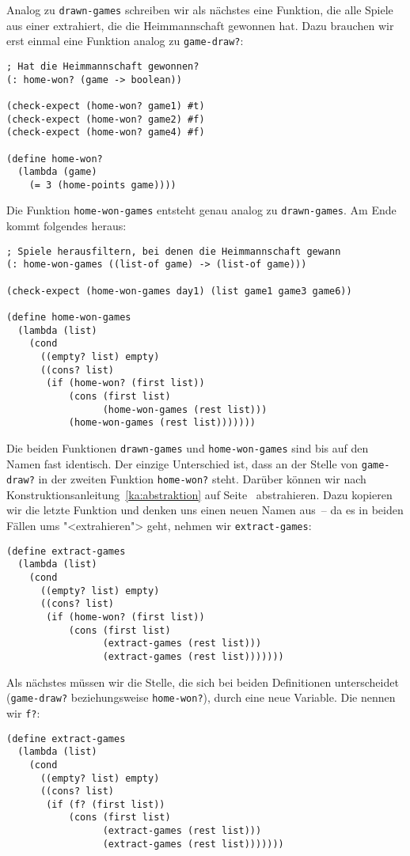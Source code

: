 Analog zu \lstinline{drawn-games} schreiben wir als nächstes eine
Funktion, die alle Spiele aus einer extrahiert, die die Heimmannschaft
gewonnen hat.  Dazu brauchen wir erst einmal eine Funktion analog zu
\lstinline{game-draw?}:
%
\begin{lstlisting}
; Hat die Heimmannschaft gewonnen?
(: home-won? (game -> boolean))

(check-expect (home-won? game1) #t)
(check-expect (home-won? game2) #f)
(check-expect (home-won? game4) #f)

(define home-won?
  (lambda (game)
    (= 3 (home-points game))))
\end{lstlisting}
%
Die Funktion \lstinline{home-won-games} entsteht genau analog zu
\lstinline{drawn-games}.  Am Ende kommt folgendes heraus:
%
\begin{lstlisting}
; Spiele herausfiltern, bei denen die Heimmannschaft gewann
(: home-won-games ((list-of game) -> (list-of game)))

(check-expect (home-won-games day1) (list game1 game3 game6))

(define home-won-games
  (lambda (list)
    (cond
      ((empty? list) empty)
      ((cons? list)
       (if (home-won? (first list))
           (cons (first list)
                 (home-won-games (rest list)))
           (home-won-games (rest list)))))))
\end{lstlisting}
%
Die beiden Funktionen \lstinline{drawn-games} und
\lstinline{home-won-games} sind bis auf den Namen fast identisch.  Der
einzige Unterschied ist, dass an der Stelle von \lstinline{game-draw?}
in der zweiten Funktion \lstinline{home-won?} steht.  Darüber können
wir nach Konstruktionsanleitung~\ref{ka:abstraktion} auf
Seite~\pageref{ka:astraktion} abstrahieren.  Dazu kopieren wir die
letzte Funktion und denken uns einen neuen Namen aus~-- da es in
beiden Fällen ums "<extrahieren"> geht, nehmen wir
\lstinline{extract-games}:
%
\begin{lstlisting}
(define extract-games
  (lambda (list)
    (cond
      ((empty? list) empty)
      ((cons? list)
       (if (home-won? (first list))
           (cons (first list)
                 (extract-games (rest list)))
                 (extract-games (rest list)))))))
\end{lstlisting}
%
Als nächstes müssen wir die Stelle, die sich bei beiden Definitionen
unterscheidet (\lstinline{game-draw?} beziehungsweise
\lstinline{home-won?}), durch eine neue Variable.  Die nennen wir
\lstinline{f?}:
%
\begin{lstlisting}
(define extract-games
  (lambda (list)
    (cond
      ((empty? list) empty)
      ((cons? list)
       (if (f? (first list))
           (cons (first list)
                 (extract-games (rest list)))
                 (extract-games (rest list)))))))
\end{lstlisting}
